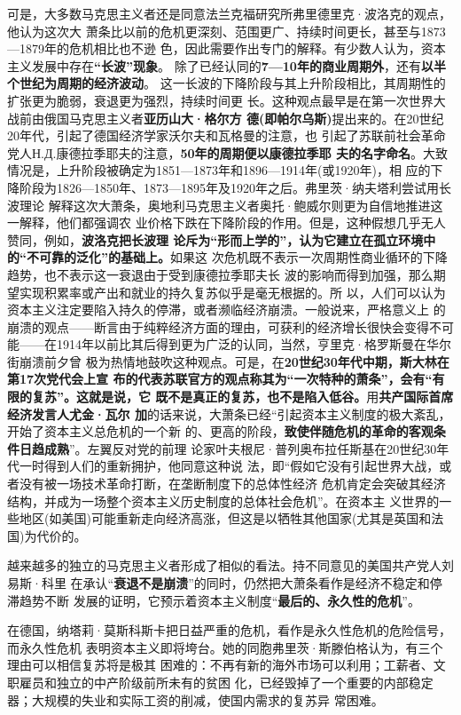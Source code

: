 可是，大多数马克思主义者还是同意法兰克福研究所弗里德里克·波洛克的观点，他认为这次大
萧条比以前的危机更深刻、范围更广、持续时间更长，甚至与1873—1879年的危机相比也不逊
色，因此需要作出专门的解释。有少数人认为，资本主义发展中存在\textbf{“长波”现象}。
除了已经认同的\textbf{7—10年的商业周期外}，还有\textbf{以半个世纪为周期的经济波动}。
这一长波的下降阶段与其上升阶段相比，其周期性的扩张更为脆弱，衰退更为强烈，持续时间更
长。这种观点最早是在第一次世界大战前由俄国马克思主义者\textbf{亚历山大·格尔方
德(即帕尔乌斯)}提出来的。在20世纪20年代，引起了德国经济学家沃尔夫和瓦格曼的注意，也
引起了苏联前社会革命党人Н.Д.康德拉季耶夫的注意，\textbf{50年的周期便以康德拉季耶
夫的名字命名}。大致情况是，上升阶段被确定为1851—1873年和1896—1914年(或1920年)，相
应的下降阶段为1826—1850年、1873—1895年及1920年之后。弗里茨·纳夫塔利尝试用长波理论
解释这次大萧条，奥地利马克思主义者奥托·鲍威尔则更为自信地推进这一解释，他们都强调农
业价格下跌在下降阶段的作用。但是，这种假想几乎无人赞同，例如，\textbf{波洛克把长波理
论斥为“形而上学的”，认为它建立在孤立环境中的“不可靠的泛化”的基础上。}如果这
次危机既不表示一次周期性商业循环的下降趋势，也不表示这一衰退由于受到康德拉季耶夫长
波的影响而得到加强，那么期望实现积累率或产出和就业的持久复苏似乎是毫无根据的。所
以，人们可以认为资本主义注定要陷入持久的停滞，或者濒临经济崩溃。一般说来，严格意义上
的崩溃的观点——断言由于纯粹经济方面的理由，可获利的经济增长很快会变得不可
能——在1914年以前比其后得到更为广泛的认同，当然，亨里克·格罗斯曼在华尔街崩溃前夕曾
极为热情地鼓吹这种观点。可是，在\textbf{20世纪30年代中期，斯大林在第17次党代会上宣
布的代表苏联官方的观点称其为“一次特种的萧条”，会有“有限的复苏”。这就是说，它
既不是真正的复苏，也不是陷入低谷。}用\textbf{共产国际首席经济发言人尤金·瓦尔
加}的话来说，大萧条已经“引起资本主义制度的极大紊乱，开始了资本主义总危机的一个新
的、更高的阶段，\textbf{致使伴随危机的革命的客观条件日趋成熟}”。左翼反对党的前理
论家叶夫根尼·普列奥布拉任斯基在20世纪30年代一时得到人们的重新拥护，他同意这种说
法，即“假如它没有引起世界大战，或者没有被一场技术革命打断，在垄断制度下的总体性经济
危机肯定会突破其经济结构，并成为一场整个资本主义历史制度的总体社会危机”。在资本主
义世界的一些地区(如美国)可能重新走向经济高涨，但这是以牺牲其他国家(尤其是英国和法
国)为代价的。

越来越多的独立的马克思主义者形成了相似的看法。持不同意见的美国共产党人刘易斯·科里
在承认“\textbf{衰退不是崩溃}”的同时，仍然把大萧条看作是经济不稳定和停滞趋势不断
发展的证明，它预示着资本主义制度“\textbf{最后的、永久性的危机}”。

在德国，纳塔莉·莫斯科斯卡把日益严重的危机，看作是永久性危机的危险信号，而永久性危机
表明资本主义即将垮台。她的同胞弗里茨·斯滕伯格认为，有三个理由可以相信复苏将是极其
困难的：不再有新的海外市场可以利用；工薪者、文职雇员和独立的中产阶级前所未有的贫困
化，已经毁掉了一个重要的内部稳定器；大规模的失业和实际工资的削减，使国内需求的复苏异
常困难。

